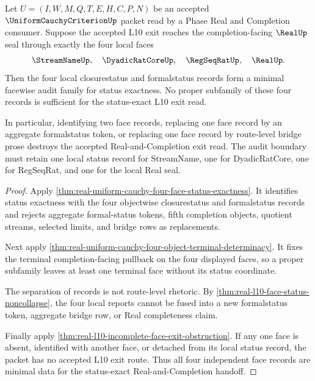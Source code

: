 \begin{theorem}
\label{thm:real-uniform-cauchy-four-face-record-minimality}
Let $U=(I,W,M,Q,T,E,H,C,P,N)$ be an accepted
$\UniformCauchyCriterionUp$ packet read by a Phase Real and Completion
consumer. Suppose the accepted L10 exit reaches the completion-facing
$\RealUp$ seal through exactly the four local faces
$$
\StreamNameUp,\quad \DyadicRatCoreUp,\quad \RegSeqRatUp,\quad \RealUp.
$$
Then the four local closurestatus and formalstatus records form a minimal
facewise audit family for status exactness. No proper subfamily of these four
records is sufficient for the status-exact L10 exit read.

In particular, identifying two face records, replacing one face record by an
aggregate formalstatus token, or replacing one face record by route-level
bridge prose destroys the accepted Real-and-Completion exit read. The audit
boundary must retain one local status record for StreamName, one for
DyadicRatCore, one for RegSeqRat, and one for the local Real seal.
\end{theorem}
\begin{proof}
Apply
\autoref{thm:real-uniform-cauchy-four-face-status-exactness}. It identifies
status exactness with the four objectwise closurestatus and formalstatus
records and rejects aggregate formal-status tokens, fifth completion objects,
quotient streams, selected limits, and bridge rows as replacements.

Next apply
\autoref{thm:real-uniform-cauchy-four-object-terminal-determinacy}. It fixes
the terminal completion-facing pullback on the four displayed faces, so a
proper subfamily leaves at least one terminal face without its status
coordinate.

The separation of records is not route-level rhetoric. By
\autoref{thm:real-l10-face-status-noncollapse}, the four local reports cannot
be fused into a new formalstatus token, aggregate bridge row, or Real
completeness claim.

Finally apply
\autoref{thm:real-l10-incomplete-face-exit-obstruction}. If any one face is
absent, identified with another face, or detached from its local status
record, the packet has no accepted L10 exit route. Thus all four independent
face records are minimal data for the status-exact Real-and-Completion
handoff.
\end{proof}


